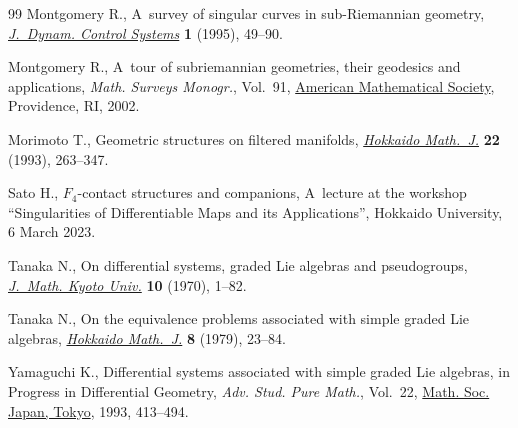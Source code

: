 \documentclass[11pt]{article}
\numberwithin{equation}{section}
\numberwithin{equation}{section}
\theoremstyle{definition}
\newcommand{\0}{\boldsymbol{0}}
\begin{document}
\begin{thebibliography}{99}
Montgomery R., A~survey of singular curves in sub-{R}iemannian geometry,
 \href{https://doi.org/10.1007/BF02254656}{\textit{J.~Dynam. Control Systems}}
 \textbf{1} (1995), 49--90.

Montgomery R., A~tour of subriemannian geometries, their geodesics and
 applications, \textit{Math. Surveys Monogr.}, Vol.~91,
 \href{https://doi.org/10.1090/surv/091}{American Mathematical Society},
 Providence, RI, 2002.

Morimoto T., Geometric structures on filtered manifolds,
 \href{https://doi.org/10.14492/hokmj/1381413178}{\textit{Hokkaido Math.~J.}}
 \textbf{22} (1993), 263--347.

Sato H., $F_4$-contact structures and companions, {A}~lecture at the workshop
 ``Singularities of Differentiable Maps and its Applications'', Hokkaido
 University, 6 March 2023.

Tanaka N., On differential systems, graded {L}ie algebras and pseudogroups,
 \href{https://doi.org/10.1215/kjm/1250523814}{\textit{J.~Math. Kyoto Univ.}}
 \textbf{10} (1970), 1--82.

Tanaka N., On the equivalence problems associated with simple graded {L}ie
 algebras, \href{https://doi.org/10.14492/hokmj/1381758416}{\textit{Hokkaido
 Math.~J.}} \textbf{8} (1979), 23--84.

Yamaguchi K., Differential systems associated with simple graded {L}ie
 algebras, in Progress in Differential Geometry, \textit{Adv. Stud. Pure
 Math.}, Vol.~22, \href{https://doi.org/10.2969/aspm/02210413}{Math. Soc.
 Japan, Tokyo}, 1993, 413--494.

\end{thebibliography}
\end{document}
